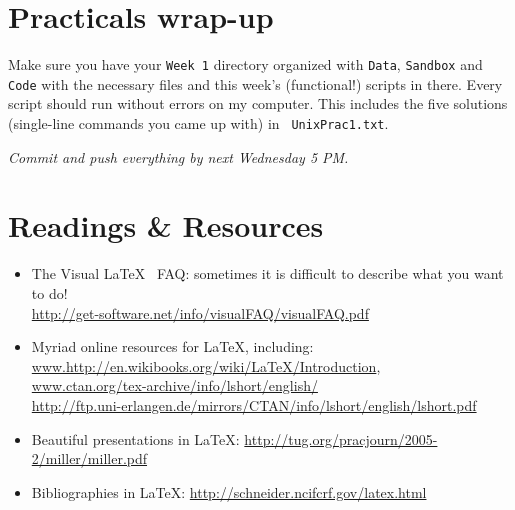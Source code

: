 \section[Practical]{Practicals wrap-up}

Make sure you have your {\tt Week 1} directory organized 
with {\tt Data}, {\tt Sandbox} and {\tt Code} with the necessary 
files and this week's (functional!) scripts in there. Every script 
should run without errors on my computer. This includes the five 
solutions (single-line commands you came up with) in {\tt 
UnixPrac1.txt}.

\begin{center}
	\it Commit and push everything by next Wednesday 5 PM.
\end{center} 

\section{Readings \& Resources}

\begin{itemize}

\item The Visual \LaTeX~ FAQ: sometimes it is difficult to describe what you
want to do!\\
\url{http://get-software.net/info/visualFAQ/visualFAQ.pdf}

\item Myriad online resources for \LaTeX, including:\\
\url{www.http://en.wikibooks.org/wiki/LaTeX/Introduction},\\
\url{www.ctan.org/tex-archive/info/lshort/english/}\\
\url{http://ftp.uni-erlangen.de/mirrors/CTAN/info/lshort/english/lshort.pdf}
\item Beautiful presentations in \LaTeX: 
\url{http://tug.org/pracjourn/2005-2/miller/miller.pdf}
\item Bibliographies in \LaTeX: \url{http://schneider.ncifcrf.gov/latex.html}

\end{itemize}


